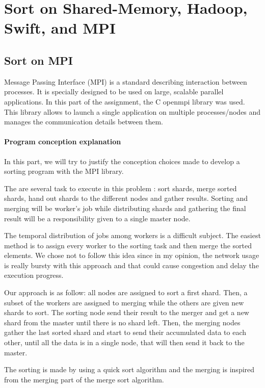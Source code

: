 \documentclass{article}
\begin{document}
\section{Sort on Shared-Memory, Hadoop, Swift, and MPI}

\subsection{Sort on MPI}

Message Passing Interface (MPI) is a standard describing interaction between processes. It is specially designed to be used on large, scalable parallel applications. In this part of the assignment, the C openmpi library was used. This library allows to launch a single application on multiple processes/nodes and manages the communication details between them.

\paragraph{Program conception explanation}

In this part, we will try to justify  the conception choices made to develop a sorting program with the MPI library.

The are several task to execute in this problem : sort shards, merge sorted shards, hand out shards to the different nodes and gather results. Sorting and merging will be worker’s job while distributing shards and gathering the final result will be a responsibility given to a single master node.

The temporal distribution of jobs among workers is a difficult subject. The easiest method is to assign every worker to the sorting task and then merge the sorted elements. We chose not to follow this idea since in my opinion, the network usage is really bursty with this approach and that could cause congestion and delay the execution progress.

Our approach is as follow: all nodes are assigned to sort a first shard. Then, a subset of the workers are assigned to merging while the others are given new shards to sort. The sorting node send their result to the merger and get a new shard from the master until there is no shard left. Then, the merging nodes gather the last sorted shard and start to send their accumulated data to each other, until all the data is in a single node, that will then send it back to the master.

The sorting is made by using a quick sort algorithm and the merging is inspired from the merging part of the merge sort algorithm.
\end{document}
